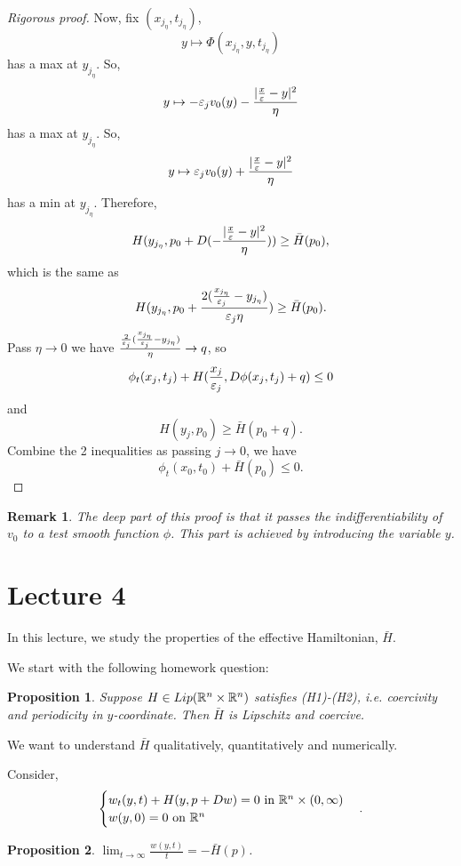\documentclass[11pt, oneside]{amsart}   	%
\newtheorem{remark}{Remark}
\newtheorem{proposition}{Proposition}
\begin{document}
\begin{proof}[Rigorous proof]
	Now, fix $(x_{j_\eta}, t_{j_\eta})$,
	$$y\mapsto \Phi(x_{j_\eta}, y, t_{j_\eta})$$ has a max at $y_{j_\eta}$. So,
	$$y\mapsto -\varepsilon_j v_0(y) - \frac{|\frac{x}{\varepsilon} - y|^2}{\eta}$$ has a max at $y_{j_\eta}$. So,
	$$y\mapsto \varepsilon_j v_0(y) + \frac{|\frac{x}{\varepsilon} - y|^2}{\eta}$$ has a min at $y_{j_\eta}$. Therefore,
	$$H(y_{j_\eta}, p_0 + D(-\frac{|\frac{x}{\varepsilon} - y|^2}{\eta})) \ge \bar{H}(p_0),$$ which is the same as
	$$H(y_{j_\eta}, p_0 +\frac{2(\frac{x_{j_\eta}}{\varepsilon_j} - y_{j_\eta})}{\varepsilon_j \eta})\ge \bar{H}(p_0).$$
	Pass $\eta\to 0$ we have $\frac{\frac{2}{\varepsilon_j}(\frac{x_{j_\eta}}{\varepsilon_j} - y_{j_\eta})}{\eta}\to q$, so
	$$\phi_t(x_{j}, t_{j})+ H(\frac{x_{j}}{\varepsilon_j}, D\phi(x_{j}, t_{j})+ q)\le 0$$
	and 
	$$H(y_{j}, p_0)\ge \bar{H}(p_0+q).$$
	Combine the 2 inequalities as passing $j\to 0$, we have
	$$\phi_t(x_0, t_0)+ \bar{H}(p_0)\le 0.$$
\end{proof}
\begin{remark}
The deep part of this proof is that it passes the indifferentiability of $v_0$ to a test smooth function $\phi$. This part is achieved by introducing the variable $y$.
\end{remark}

\section*{Lecture 4}
In this lecture, we study the properties of the effective Hamiltonian, $\bar{H}$.

We start with the following homework question:
\begin{proposition}
	Suppose $H\in Lip(\mathbb{R}^n\times\mathbb{R}^n)$ satisfies (H1)-(H2), i.e. coercivity and periodicity in $y$-coordinate. Then $\bar{H}$ is Lipschitz and coercive. 
\end{proposition}

We want to understand $\bar{H}$ qualitatively, quantitatively and numerically.

Consider,
\begin{equation}
	\begin{cases}
		w_t(y,t) + H(y, p + Dw)=0 \text{ in $\mathbb{R}^n\times (0,\infty)$}\\
		w(y,0) = 0 \text{ on $\mathbb{R}^n$}
	\end{cases}.
\end{equation}

\begin{proposition}
	$\lim_{t\to\infty} \frac{w(y,t)}{t}=-\bar{H}(p)$.
\end{proposition}
\end{document}

